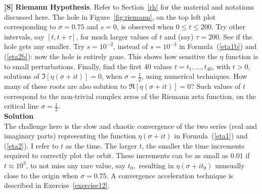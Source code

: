 \documentclass[10pt]{article}
\begin{document}
\begin{Exercise}\label{exercise11}{\bf [S]} 
 {\bf Riemann Hypothesis}. Refer to Section~\ref{rh} for the material and notations discussed here. The hole in Figure~\ref{fig:riemann}, on the top left plot corresponding to $\sigma=0.75$ and $s=0$, is observed when $0\leq t \leq 200$. Try other intervals, say $[t, t+\tau]$, for much larger values of $t$ and (say) $\tau=200$. See if the hole gets any smaller. Try $s=10^{-2}$, instead of $s=10^{-3}$ in Formula~(\ref{eta1b}) and (\ref{eta2b}): now the hole is entirely gone. This shows how sensitive the $\eta$ function is to small perturbations. Finally, find the first 40 values $t=t_1,\dots,t_{40}$, with $t>0$, solutions of $\Im[\eta(\sigma+it)]=0$, when $\sigma=\frac{1}{2}$, using numerical techniques. How many of these roots are also solution to 
$\Re[\eta(\sigma+it)]=0$? Such values of $t$ correspond to the non-trivial complex zeros of the Riemann zeta function, on the critical line $\sigma=\frac{1}{2}$. \vspace{1ex}   \\
{\bf Solution} \vspace{1ex}   \\
The challenge here is the slow and \textcolor{index}{chaotic convergence} of the two series (real and imaginary parts) representing the function $\eta(\sigma +it)$ in Formula~(\ref{eta1}) and (\ref{eta2}).  I refer to $t$ as the time. The larger $t$, the smaller the time increments required to correctly plot the orbit. These increments can be as small as $0.01$ if $t\approx 10^3$, to not miss any rare value, say $t_0,$ resulting in $\eta(\sigma+it_0)$ unusually close to the origin when $\sigma=0.75$.  A convergence acceleration technique is described in Exercise~\ref{exercise12}.
\end{Exercise}
\end{document}
